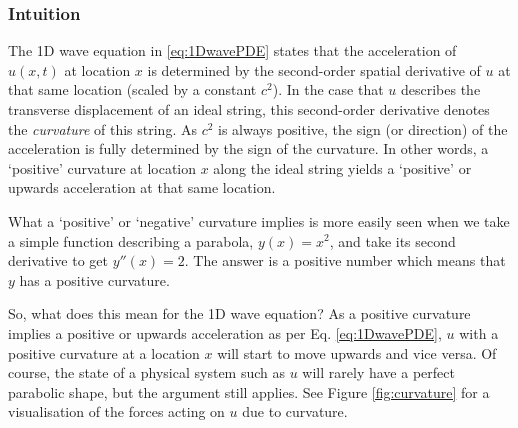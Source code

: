 \subsubsection{Intuition}




The 1D wave equation in \eqref{eq:1DwavePDE} states that the acceleration of $u(x,t)$ at location $x$ is determined by the second-order spatial derivative of $u$ at that same location (scaled by a constant $c^2$). In the case that $u$ describes the transverse displacement of an ideal string, this second-order derivative denotes the \textit{curvature} of this string. As $c^2$ is always positive, the sign (or direction) of the acceleration is fully determined by the sign of the curvature. In other words, a `positive' curvature at location $x$ along the ideal string yields a `positive' or upwards acceleration at that same location. 

What a `positive' or `negative' curvature implies is more easily seen when we take a simple function describing a parabola, $y(x) = x^2$, and take its second derivative to get $y''(x) = 2$. The answer is a positive number which means that $y$ has a positive curvature. 

So, what does this mean for the 1D wave equation? As a positive curvature implies a positive or upwards acceleration as per Eq. \eqref{eq:1DwavePDE}, $u$ with a positive curvature at a location $x$ will start to move upwards and vice versa. Of course, the state of a physical system such as $u$ will rarely have a perfect parabolic shape, but the argument still applies. See Figure \ref{fig:curvature} for a visualisation of the forces acting on $u$ due to curvature.

